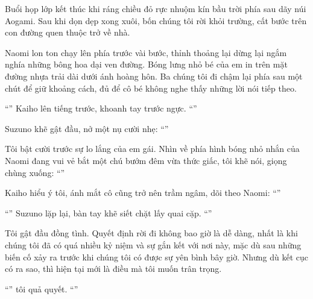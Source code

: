 \documentclass[../main.tex]{subfiles}
\begin{document}
\ct

Buổi họp lớp kết thúc khi ráng chiều đỏ rực nhuộm kín bầu trời phía sau dãy núi Aogami. Sau khi dọn dẹp xong xuôi, bốn chúng tôi rời khỏi trường, cất bước trên con đường quen thuộc trở về nhà.

Naomi lon ton chạy lên phía trước vài bước, thỉnh thoảng lại dừng lại ngắm nghía những bông hoa dại ven đường. Bóng lưng nhỏ bé của em in trên mặt đường nhựa trải dài dưới ánh hoàng hôn. Ba chúng tôi đi chậm lại phía sau một chút để giữ khoảng cách, đủ để cô bé không nghe thấy những lời nói tiếp theo.

``'' Kaiho lên tiếng trước, khoanh tay trước ngực. ``''

Suzuno khẽ gật đầu, nở một nụ cười nhẹ: ``''

Tôi bật cười trước sự lo lắng của em gái. Nhìn về phía hình bóng nhỏ nhắn của Naomi đang vui vẻ bắt một chú bướm đêm vừa thức giấc, tôi khẽ nói, giọng chùng xuống: ``''

Kaiho hiểu ý tôi, ánh mắt cô cũng trở nên trầm ngâm, dõi theo Naomi: ``''

``'' Suzuno lặp lại, bàn tay khẽ siết chặt lấy quai cặp. ``''

Tôi gật đầu đồng tình. Quyết định rời đi không bao giờ là dễ dàng, nhất là khi chúng tôi đã có quá nhiều kỷ niệm và sự gắn kết với nơi này, mặc dù sau những biến cố xảy ra trước khi chúng tôi có được sự yên bình bây giờ. Nhưng dù kết cục có ra sao, thì hiện tại mới là điều mà tôi muốn trân trọng.

``'' tôi quả quyết. ``''
\end{document}
